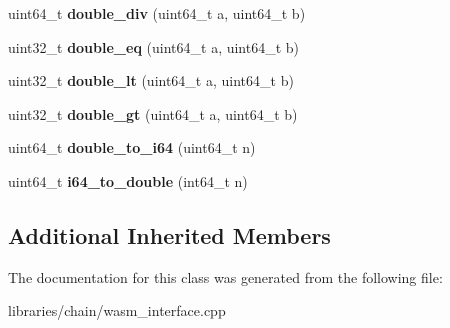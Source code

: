 \begin{DoxyCompactItemize}
uint64\+\_\+t {\bfseries double\+\_\+div} (uint64\+\_\+t a, uint64\+\_\+t b)
\item 
\mbox{\label{classaacio_1_1chain_1_1math__api_ac1282d8923d04b493b4fcdf0a6fd835b}} 
uint32\+\_\+t {\bfseries double\+\_\+eq} (uint64\+\_\+t a, uint64\+\_\+t b)
\item 
\mbox{\label{classaacio_1_1chain_1_1math__api_aeff7a4666362f710862f4854bbd207f3}} 
uint32\+\_\+t {\bfseries double\+\_\+lt} (uint64\+\_\+t a, uint64\+\_\+t b)
\item 
\mbox{\label{classaacio_1_1chain_1_1math__api_a19f7eca6028557dcd9e959afb32df992}} 
uint32\+\_\+t {\bfseries double\+\_\+gt} (uint64\+\_\+t a, uint64\+\_\+t b)
\item 
\mbox{\label{classaacio_1_1chain_1_1math__api_a56dec0b8738118ab9c2f2b7ea9780e72}} 
uint64\+\_\+t {\bfseries double\+\_\+to\+\_\+i64} (uint64\+\_\+t n)
\item 
\mbox{\label{classaacio_1_1chain_1_1math__api_ad2daf59aaf17171bb0ec9eaa33ed565e}} 
uint64\+\_\+t {\bfseries i64\+\_\+to\+\_\+double} (int64\+\_\+t n)
\end{DoxyCompactItemize}
\subsection*{Additional Inherited Members}


The documentation for this class was generated from the following file\+:\begin{DoxyCompactItemize}
\item 
libraries/chain/wasm\+\_\+interface.\+cpp\end{DoxyCompactItemize}
